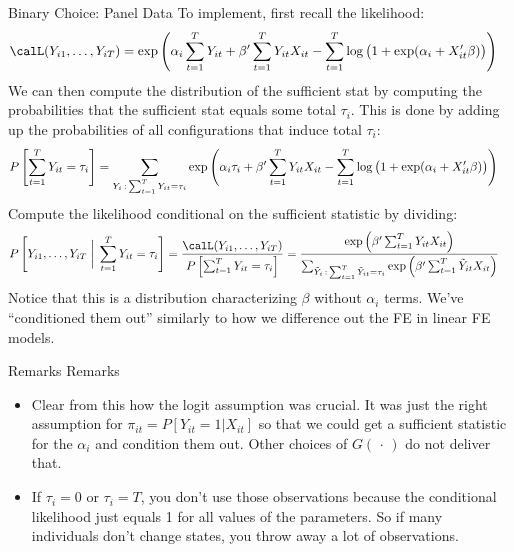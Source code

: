 \documentclass[aspectratio=169, handout]{beamer}
\newcommand{\sumtT}{\sum^T_{t=1}}
\begin{document}
{\footnotesize
\begin{frame}{Binary Choice: Panel Data}
To implement, first recall the likelihood:
\begin{align*}
  &\calL(Y_{i1},\ldots,Y_{iT})
  =
  \exp\left(
  \alpha_i
  \sumtT
  Y_{it}
  +
  \beta'
  \sumtT
  Y_{it} X_{it}
  -
  \sumtT
  \log\big(1+\exp(\alpha_i+X_{it}'\beta)\big)
  \right)
\end{align*}
We can then compute the distribution of the sufficient stat by computing
the probabilities that the sufficient stat equals some total $\tau_i$.
This is done by adding up the probabilities of all configurations that
induce total $\tau_i$:
\begin{align*}
  &
  P\left[
  \sumtT
  Y_{it}
  =
  \tau_i
  \right]
  =
  \sum_{%
    {Y}_i\,:\,\sum_{t=1}^TY_{it}=\tau_i
  }
  \exp\left(
  \alpha_i
  \tau_i
  +
  \beta'
  \sumtT
  {Y}_{it} X_{it}
  -
  \sumtT
  \log\big(1+\exp(\alpha_i+X_{it}'\beta)\big)
  \right)
\end{align*}
Compute the likelihood conditional on the sufficient statistic by
dividing:
\begin{align*}
  P\left[
  Y_{i1},\ldots,Y_{iT}
  \;\bigg|\;
  \sumtT
  Y_{it}
  =
  \tau_i
  \right]
  &=
  \frac{%
    \calL(Y_{i1},\ldots,Y_{iT})
  }{%
    P\left[
    \sumtT
    Y_{it}
    =
    \tau_i
    \right]
  }
  =
  \frac{%
    \exp\left(
    \beta'
    \sumtT
    Y_{it} X_{it}
    \right)
  }{%
    \sum_{%
      \tilde{Y}_i\,:\,\sum_{t=1}^T\tilde{Y}_{it}=\tau_i
    }
    \exp\left(
    \beta'
    \sumtT
    \tilde{Y}_{it} X_{it}
    \right)
  }
\end{align*}
Notice that this is a distribution characterizing $\beta$ without
$\alpha_i$ terms.
We've ``conditioned them out'' similarly to how we difference out the FE
in linear FE models.
\end{frame}
}


\begin{frame}[shrink]{Remarks}
Remarks
\begin{itemize}
  \item Clear from this how the logit assumption was crucial.
    It was just the right assumption for $\pi_{it}=P[Y_{it}=1|X_{it}]$
    so that we could get a sufficient statistic for the $\alpha_i$ and
    condition them out.
    Other choices of $G(\,\cdot\,)$ do not deliver that.
  \item
    If $\tau_i=0$ or $\tau_i=T$, you don't use those observations
    because the conditional likelihood just equals 1 for all values of
    the parameters.
    So if many individuals don't change states, you throw away a lot of
    observations.
\end{itemize}
\end{frame}
\end{document}

